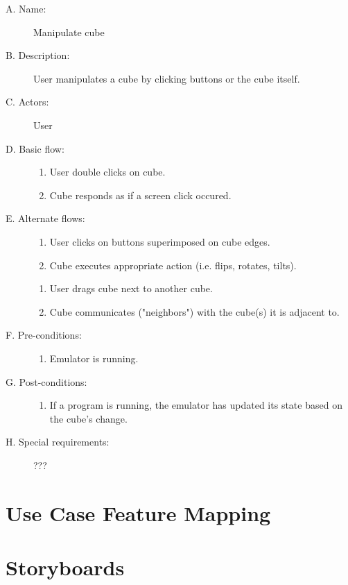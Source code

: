\documentclass[12pt]{article}
\begin{document}
    \begin{description}
      \item[A. Name:] Manipulate cube
      \item[B. Description:] User manipulates a cube by clicking buttons or the cube itself.
      \item[C. Actors:] User
      \item[D. Basic flow:] \hfill
        \begin{enumerate}
	  \item{User double clicks on cube.}
	  \item{Cube responds as if a screen click occured.}
        \end{enumerate}
      \item[E. Alternate flows:] \hfill
        \begin{enumerate}
	  \item{User clicks on buttons superimposed on cube edges.}
	  \item{Cube executes appropriate action (i.e. flips, rotates, tilts).}
        \end{enumerate}
        \begin{enumerate}
          \item{User drags cube next to another cube.}
	  \item{Cube communicates ("neighbors") with the cube(s) it is adjacent to.}
        \end{enumerate}
      \item[F. Pre-conditions:] \hfill
        \begin{enumerate}
          \item{Emulator is running.}
        \end{enumerate}
      \item[G. Post-conditions:] \hfill
        \begin{enumerate}
	  \item{If a program is running, the emulator has updated its state based on the cube's change.}
        \end{enumerate}
      \item[H. Special requirements:] ???
    \end{description}

\section{Use Case Feature Mapping}


\section{Storyboards}
\end{document}
